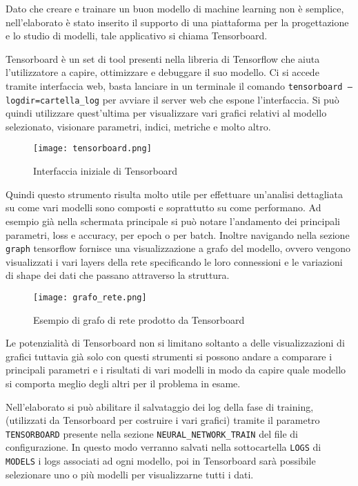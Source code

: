 Dato che creare e trainare un buon modello di machine learning non è semplice, nell’elaborato è stato inserito il supporto di una piattaforma per la progettazione e lo studio di modelli, tale applicativo si chiama Tensorboard.

Tensorboard è un set di tool presenti nella libreria di Tensorflow che aiuta l’utilizzatore a capire, ottimizzare e debuggare il suo modello. Ci si accede tramite interfaccia web, basta lanciare in un terminale il comando \texttt{tensorboard --logdir=cartella\_log} per avviare il server web che espone l’interfaccia. Si può quindi utilizzare quest’ultima per visualizzare vari grafici relativi al modello selezionato, visionare parametri, indici, metriche e molto altro.

\begin{figure}[h]
  \centering
  \texttt{[image: tensorboard.png]}
  \caption{Interfaccia iniziale di Tensorboard}
\end{figure}

Quindi questo strumento risulta molto utile per effettuare un'analisi dettagliata su come vari modelli sono composti e soprattutto su come performano. Ad esempio già nella schermata principale si può notare l’andamento dei principali parametri, loss e accuracy, per epoch o per batch. Inoltre navigando nella sezione \texttt{graph} tensorflow fornisce una visualizzazione a grafo del modello, ovvero vengono visualizzati i vari layers della rete specificando le loro connessioni e le variazioni di shape dei dati che passano attraverso la struttura.

\begin{figure}[h]
  \centering
  \texttt{[image: grafo\_rete.png]}
  \caption{Esempio di grafo di rete prodotto da Tensorboard}
\end{figure}

Le potenzialità di Tensorboard non si limitano soltanto a delle visualizzazioni di grafici tuttavia già solo con questi strumenti si possono andare a comparare i principali parametri e i risultati di vari modelli in modo da capire quale modello si comporta meglio degli altri per il problema in esame.

Nell’elaborato si può abilitare il salvataggio dei log della fase di training, (utilizzati da Tensorboard per costruire i vari grafici) tramite il parametro \texttt{TENSORBOARD} presente nella sezione \texttt{NEURAL\_NETWORK\_TRAIN} del file di configurazione. In questo modo verranno salvati nella sottocartella \texttt{LOGS} di \texttt{MODELS} i logs associati ad ogni modello, poi in Tensorboard sarà possibile selezionare uno o più modelli per visualizzarne tutti i dati.
